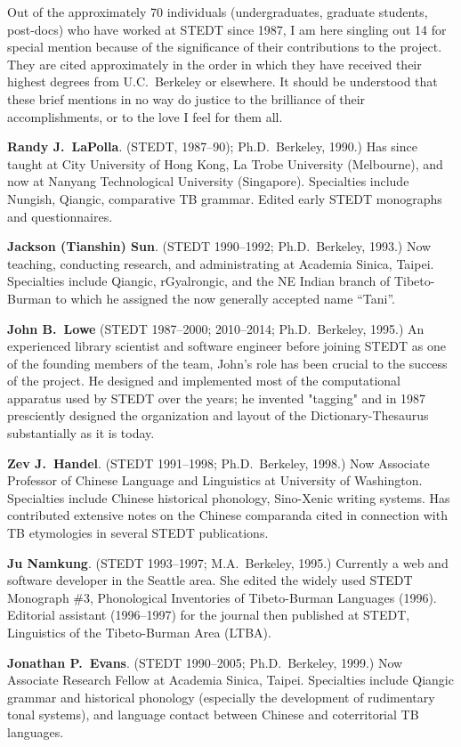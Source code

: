 Out of the approximately 70 individuals (undergraduates, graduate students, post-docs) who have worked at STEDT since 1987, I am here singling out 14 for special mention because of the significance of their contributions to the project. They are cited approximately in the order in which they have received their highest degrees from U.C.\ Berkeley or elsewhere. It should be understood that these brief mentions in no way do justice to the brilliance of their accomplishments, or to the love I feel for them all.

\textbf{Randy J.\ LaPolla}. (STEDT, 1987–90); Ph.D.\ Berkeley, 1990.) Has since taught at City University of Hong Kong, La Trobe University (Melbourne), and now at Nanyang Technological University (Singapore). Specialties include Nungish, Qiangic, comparative TB grammar. Edited early STEDT monographs and questionnaires.

\textbf{Jackson (Tianshin) Sun}. (STEDT 1990–1992; Ph.D.\ Berkeley, 1993.) Now teaching, conducting research, and administrating at Academia Sinica, Taipei. Specialties include Qiangic, rGyalrongic, and the NE Indian branch of Tibeto-Burman to which he assigned the now generally accepted name “Tani”.

\textbf{John B.\ Lowe} (STEDT 1987–2000; 2010–2014; Ph.D.\ Berkeley, 1995.) An experienced library scientist and software engineer before
joining STEDT as one of the founding members of the team, John's role has been crucial to the success of the project.  He designed and implemented most of the computational apparatus used by STEDT over the years; he invented "tagging" and in 1987 presciently designed the organization and layout of the Dictionary-Thesaurus substantially as it is today.

\textbf{Zev J.\ Handel}. (STEDT 1991–1998; Ph.D.\ Berkeley, 1998.) Now Associate Professor of Chinese Language and Linguistics at University of Washington. Specialties include Chinese historical phonology, Sino-Xenic writing systems. Has contributed extensive notes on the Chinese comparanda cited in connection with TB etymologies in several STEDT publications.

\textbf{Ju Namkung}. (STEDT 1993–1997; M.A.\ Berkeley, 1995.) Currently a web and software developer in the Seattle area. She edited the widely used STEDT Monograph \#3, Phonological Inventories of Tibeto-Burman Languages (1996). Editorial assistant (1996–1997) for the journal then published at STEDT, Linguistics of the Tibeto-Burman Area (LTBA).

\textbf{Jonathan P.\ Evans}. (STEDT 1990–2005; Ph.D.\ Berkeley, 1999.) Now Associate Research Fellow at Academia Sinica, Taipei. Specialties include Qiangic grammar and historical phonology (especially the development of rudimentary tonal systems), and language contact between Chinese and coterritorial TB languages.

